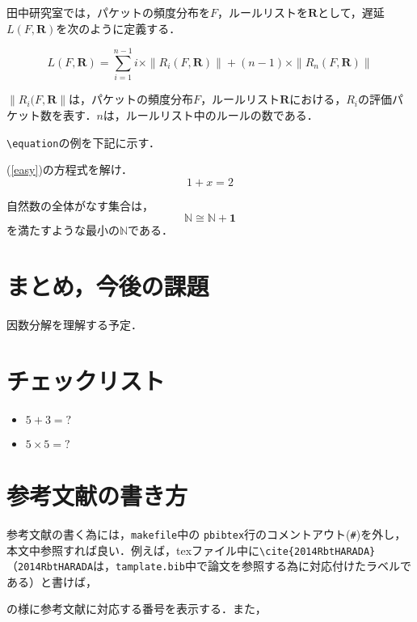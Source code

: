 \documentclass[10pt,twocolumn]{jarticle}
\begin{document}
田中研究室では，パケットの頻度分布を$F$，ルールリストを${\mathbf R}$として，遅延$L(F, {\mathbf R})$を次のように定義する．

\[
 L(F, {\mathbf R}) = \sum_{i=1}^{n-1} i \times \| R_{i}(F, {\mathbf R})\| + (n-1) \times \| R_{n}(F, {\mathbf R})\| 
\]

$\|R_{i}(F, {\mathbf R}\|$は，パケットの頻度分布$F$，ルールリスト${\mathbf R}$における，$R_{i}$の評価パケット数を表す．$n$は，ルールリスト中のルールの数である．

\par

\verb|\equation|の例を下記に示す．\par
(\ref{easy})の方程式を解け．
\begin{equation}
 1 + x = 2
 \label{easy}
\end{equation}

自然数の全体がなす集合は，
\begin{equation}
\mathbb{N} \cong \mathbb{N} + \mathbf{1}
 \label{nat}
\end{equation}
を満たすような最小の$\mathbb{N}$である．

\section{まとめ，今後の課題}
因数分解を理解する予定．

\par

{\small
 
 
}

\section{チェックリスト}
\begin{itemize}
\item $5 + 3 = ?$
\item $5 \times 5 = ?$
\end{itemize}

\appendix
\section{参考文献の書き方}

参考文献の書く為には，\verb|makefile|中の \verb|pbibtex|行のコメントアウト(\verb|#|)を外し，本文中参照すれば良い．例えば，texファイル中に\verb|\cite{2014RbtHARADA}|（\verb|2014RbtHARADA|は，\verb|tamplate.bib|中で論文\cite{2014RbtHARADA}を参照する為に対応付けたラベルである）と書けば，\par
{\centering

\cite{2014RbtHARADA}

}
\noindent の様に参考文献に対応する番号を表示する．また，
\end{document}
